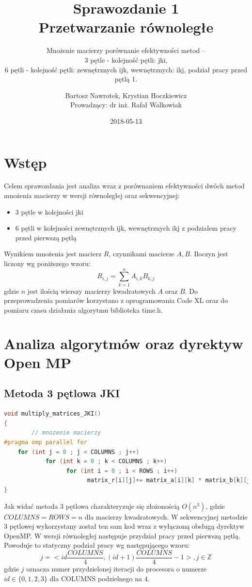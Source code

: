 \documentclass{scrartcl}
\title{Sprawozdanie 1 \\ Przetwarzanie równoległe}
\subtitle{Mnożenie macierzy porównanie efektywności metod –\\
3 pętle - kolejność pętli: jki,\\
6 pętli - kolejność pętli: zewnętrznych ijk, wewnętrznych: ikj, podział pracy przed pętlą 1.}
\date{2018-05-13}
\author{Bartosz Nawrotek, Krystian Hoczkiewicz \\
Prowadzący: dr inż. Rafał Walkowiak}
\begin{document}
\maketitle
\section{Wstęp}
Celem sprawozdania jest analiza wraz z porównaniem efektywności dwóch metod mnożenia macierzy w wersji równoległej oraz sekwencyjnej:
\begin{itemize}
\item {3 pętle w kolejności jki}
\item {6 pętli w kolejności zewnętrznych ijk, wewnętrznych ikj z podziałem pracy przed pierwszą pętlą}
\end{itemize}
Wynikiem mnożenia jest macierz $R$, czynnikami macierze $A, B$. Iloczyn jest liczony wg poniższego wzoru:
\begin{equation}
R_{i, j} = \sum_{k = 1}^{n}{A_{i, k}B_{k, j}}
\end{equation}
gdzie $n$ jest ilością wierszy macierzy kwadratowych $A$ oraz $B$.
Do przeprowadzenia pomiarów korzystano z oprogramowania Code XL oraz do pomiaru czasu działania algorytmu biblioteka time.h.
\section{Analiza algorytmów oraz dyrektyw Open MP}
\subsection{Metoda 3 pętlowa JKI}
\begin{lstlisting}[language=C++, caption={Metoda trzypętlowa}]
void multiply_matrices_JKI()
{
        // mnozenie macierzy 
#pragma omp parallel for 
	for (int j = 0 ; j < COLUMNS ; j++)
      	    for (int k = 0 ; k < COLUMNS ; k++) 
                  for (int i = 0 ; i < ROWS ; i++) 
                        matrix_r[i][j]+= matrix_a[i][k] * matrix_b[k][j] ;              
}
\end{lstlisting}
Jak widać metoda 3 pętlowa charakteryzuje się złożonością $O(n^3)$, gdzie $COLUMNS = ROWS = n$ dla macierzy kwadratowych. W sekwencyjnej metodzie 3 pętlowej wykorzystany został ten sam kod wraz z wyłączoną obsługą dyrektyw OpenMP. W wersji równoległej następuje przydział pracy przed pierwszą pętlą. Powoduje to statyczny podział pracy wg następującego wzoru:
\begin{equation}
j = <id \frac{COLUMNS}{4}, (id + 1)\frac{COLUMNS}{4} - 1>,
j \in \mathbb{Z}
\end{equation}
gdzie $j$ oznacza numer przydzielonej iteracji do procesora o numerze $id \in \{0, 1, 2, 3\}$ dla COLUMNS podzielnego na 4.
\end{document}
